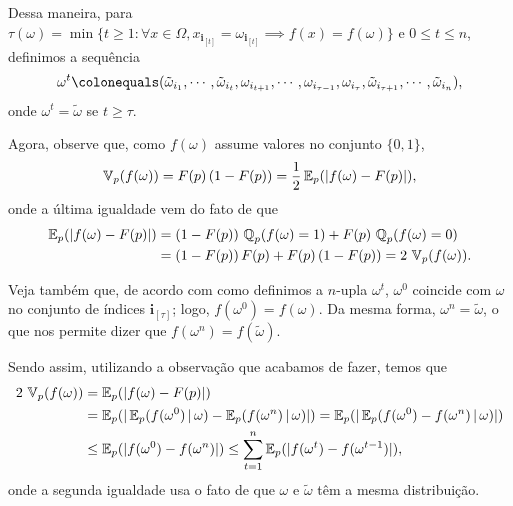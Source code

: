 Dessa maneira, para $\tau(\omega) = \min\{t \geq 1: \forall x \in \Omega, x_{\mathbf{i}_{[t]}} = \omega_{\mathbf{i}_{[t]}} \implies f(x) = f(\omega)\}$ e $0 \leq t \leq n$, definimos a sequência\vspace{-3pt}
\begin{align*}
\omega^{t} \colonequals (\tilde{\omega}_{i_1}, \cdots, \tilde{\omega}_{i_t}, \omega_{i_{t+1}}, \cdots, \omega_{i_{\tau-1}}, \omega_{i_{\tau}}, \tilde{\omega}_{i_{\tau+1}}, \cdots, \tilde{\omega}_{i_n}),
\end{align*}
onde $\omega^t = \tilde{\omega}$ se $t \geq \tau$.

\par Agora, observe que, como $f(\omega)$ assume valores no conjunto $\{0, 1\}$,
\begin{align*}
	\operatorname{\mathbb{V}}_p(f(\omega)) = F(p) \, (1 - F(p)) = \frac{1}{2} \operatorname{\mathbb{E}}_p(|f(\omega) - F(p)|),
\end{align*}
onde a última igualdade vem do fato de que\vspace{-9pt}
\begin{align*}
	\operatorname{\mathbb{E}}_p(|f(\omega) - F(p)|) &= (1 - F(p)) \, \operatorname{\mathbb{Q}}_p(f(\omega) = 1) + F(p) \, \operatorname{\mathbb{Q}}_p(f(\omega) = 0) \\
							  &= (1 - F(p)) \, F(p) + F(p) \, (1 - F(p)) = 2 \, \operatorname{\mathbb{V}}_p(f(\omega)).
\end{align*}

\par Veja também que, de acordo com como definimos a $n$-upla $\omega^t$, $\omega^0$ coincide com $\omega$ no conjunto de índices $\mathbf{i}_{[\tau]}$; logo, $f(\omega^0) = f(\omega)$. Da mesma forma, $\omega^n = \tilde{\omega}$, o que nos permite dizer que $f(\omega^n) = f(\tilde{\omega})$.

\par Sendo assim, utilizando a observação que acabamos de fazer, temos que
\begin{align*}
	2\,\operatorname{\mathbb{V}}_p(f(\omega)) & = \operatorname{\mathbb{E}}_p(|f(\omega) - F(p)|) \\
						& = \operatorname{\mathbb{E}}_p(|\operatorname{\mathbb{E}}_p(f(\omega^0)\,|\,\omega) - \operatorname{\mathbb{E}}_p(f(\omega^{n})\,|\,\omega)|) 
						  = \operatorname{\mathbb{E}}_p(|\operatorname{\mathbb{E}}_p(f(\omega^0) - f(\omega^n) \, | \, \omega)|) \\
						& \leq \operatorname{\mathbb{E}}_p(|f(\omega^0) - f(\omega^n)|)
						  \leq \sum_{t = 1}^{n} \operatorname{\mathbb{E}}_p(|f(\omega^t) - f(\omega^{t-1})|),
\end{align*}
onde a segunda igualdade usa o fato de que $\omega$ e $\tilde{\omega}$ têm a mesma distribuição.

